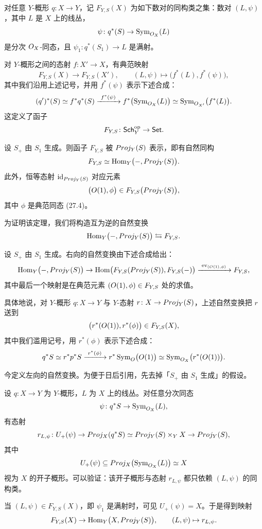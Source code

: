 \begin{construction}\label{con:27.5.1}
对任意 $Y$-概形 $q \colon X \to Y$，记 $F_{Y,S}(X)$ 为如下数对的同构类之集：数对 $(L, \psi)$，其中 $L$ 是 $X$ 上的线丛，
\[
\psi \colon q^*(S) \to \operatorname{Sym}_{O_X}(L)
\]
是分次 $O_X$-同态，且 $\psi_1 \colon q^*(S_1) \to L$ 是满射。

对 $Y$-概形之间的态射 $f \colon X' \to X$，有典范映射
\[
F_{Y,S}(X) \to F_{Y,S}(X'), \qquad (L, \psi) \mapsto \bigl(f^*(L), f^*(\psi)\bigr),
\]
其中我们沿用上述记号，并用 $f^*(\psi)$ 表示下述合成：
\[
(q')^*(S) \simeq f^* q^*(S) \xrightarrow{\ f^*(\psi)\ } f^*\bigl(\operatorname{Sym}_{O_X}(L)\bigr) \simeq \operatorname{Sym}_{O_{X'}}\bigl(f^*(L)\bigr).
\]
这定义了函子
\[
F_{Y,S} \colon \mathsf{Sch}_Y^{\mathrm{op}} \to \mathsf{Set}.
\]
\end{construction}

\begin{theorem}\label{thm:27.5.2}
设 $S_+$ 由 $S_1$ 生成。则函子 $F_{Y,S}$ 被 $Proj_Y(S)$ 表示，即有自然同构
\[
F_{Y,S} \simeq \operatorname{Hom}_Y\bigl(-, Proj_Y(S)\bigr).
\]
此外，恒等态射 $\operatorname{id}_{Proj_Y(S)}$ 对应元素
\[
\bigl(O(1), \phi\bigr) \in F_{Y,S}\bigl(Proj_Y(S)\bigr),
\]
其中 $\phi$ 是典范同态 (27.4)。
\end{theorem}

为证明该定理，我们将构造互为逆的自然变换
\[
\operatorname{Hom}_Y\bigl(-, Proj_Y(S)\bigr) \leftrightarrows F_{Y,S}.
\]

\begin{construction}\label{con:27.5.3}
设 $S_+$ 由 $S_1$ 生成。右向的自然变换由下述合成给出：
\[
\Hom_Y\bigl(-, \Proj_Y(S)\bigr) \to \Hom\bigl(F_{Y,S}(\Proj_Y(S)), F_{Y,S}(-)\bigr) \xrightarrow{\ \mathrm{ev}_{(\cO(1), \phi)}\ } F_{Y,S},
\]
其中最后一个映射是在典范元素 $(O(1), \phi) \in F_{Y,S}$ 处的求值。

具体地说，对 $Y$-概形 $q \colon X \to Y$ 与 $Y$-态射 $r \colon X \to Proj_Y(S)$，上述自然变换把 $r$ 送到
\[
\bigl(r^*(O(1)), r^*(\phi)\bigr) \in F_{Y,S}(X),
\]
其中我们滥用记号，用 $r^*(\phi)$ 表示下述合成：
\[
q^*S \simeq r^* p^* S \xrightarrow{\ r^*(\phi)\ } r^*\operatorname{Sym}_{O}\bigl(O(1)\bigr) \simeq \operatorname{Sym}_{O_X}\bigl(r^*(O(1))\bigr).
\]
\end{construction}

\begin{construction}\label{con:27.5.4}
今定义左向的自然变换。为便于日后引用，先去掉「$S_+$ 由 $S_1$ 生成」的假设。

设 $q \colon X \to Y$ 为 $Y$-概形，$L$ 为 $X$ 上的线丛。对任意分次同态
\[
\psi \colon q^*S \to \operatorname{Sym}_{O_X}(L),
\]
有态射
\[
r_{L,\psi} \colon U_+(\psi) \to Proj_X(q^*S) \simeq Proj_Y(S) \times_Y X \to Proj_Y(S),
\]
其中
\[
U_+(\psi) \subseteq Proj_X\bigl(\operatorname{Sym}_{O_X}(L)\bigr) \simeq X
\]
视为 $X$ 的开子概形。可以验证：该开子概形与态射 $r_{L,\psi}$ 都只依赖 $(L, \psi)$ 的同构类。

当 $(L, \psi) \in F_{Y,S}(X)$，即 $\psi_1$ 是满射时，可见 $U_+(\psi) = X$。于是得到映射
\[
F_{Y,S}(X) \to \operatorname{Hom}_Y\bigl(X, Proj_Y(S)\bigr), \qquad (L, \psi) \mapsto r_{L,\psi}.
\]
\end{construction}

